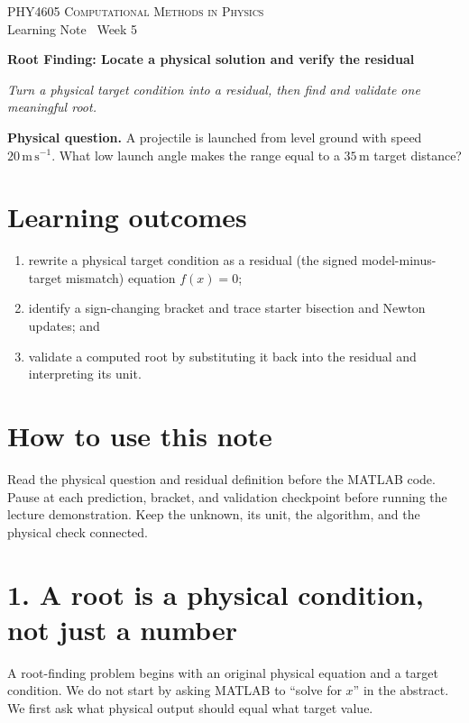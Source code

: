 \documentclass[11pt,a4paper]{article}
\newcommand{\course}{PHY4605 Computational Methods in Physics}
\newcommand{\units}[1]{\,\mathrm{#1}}
\begin{document}
{\large\textsc{\course}}\\[-2pt]
{\small Learning Note \textbar\ Week 5}\par\vspace{4pt}
{\LARGE\bfseries Root Finding: Locate a physical solution and verify the residual}\par\vspace{3pt}
\textit{Turn a physical target condition into a residual, then find and validate one meaningful root.}

\begin{keybox}\textbf{Physical question.} A projectile is launched from level ground with speed $20\units{m\,s^{-1}}$. What low launch angle makes the range equal to a $35\units{m}$ target distance?\end{keybox}

\section*{Learning outcomes}
\begin{enumerate}[nosep,leftmargin=5mm]
\item rewrite a physical target condition as a residual (the signed model-minus-target mismatch) equation $f(x)=0$;
\item identify a sign-changing bracket and trace starter bisection and Newton updates; and
\item validate a computed root by substituting it back into the residual and interpreting its unit.
\end{enumerate}

\section*{How to use this note}
Read the physical question and residual definition before the MATLAB code. Pause at each prediction, bracket, and validation checkpoint before running the lecture demonstration. Keep the unknown, its unit, the algorithm, and the physical check connected.

\section*{1. A root is a physical condition, not just a number}
A root-finding problem begins with an original physical equation and a target condition. We do not start by asking MATLAB to ``solve for $x$'' in the abstract. We first ask what physical output should equal what target value.
\end{document}
